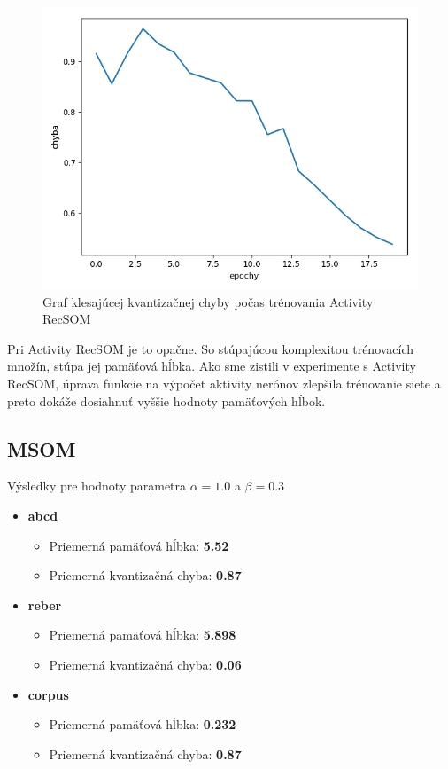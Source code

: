 \begin{figure}[H]
    \centering
    \includegraphics[width=\textwidth]{assets/ra_error_top}
    \caption{Graf klesajúcej kvantizačnej chyby počas trénovania Activity RecSOM}
\end{figure}

Pri Activity RecSOM je to opačne. So stúpajúcou komplexitou trénovacích množín, 
stúpa jej pamäťová hĺbka. Ako sme zistili v experimente s Activity RecSOM, úprava funkcie 
na výpočet aktivity nerónov zlepšila trénovanie siete a preto dokáže dosiahnuť vyššie hodnoty
pamäťových hĺbok.


\subsection{MSOM}
Výsledky pre hodnoty parametra $\alpha = 1.0$ a $\beta = 0.3$
\begin{itemize}
    \item \textbf{abcd}
    \begin{itemize}
        \item Priemerná pamäťová hĺbka: \textbf{5.52}
        \item Priemerná kvantizačná chyba: \textbf{0.87}
    \end{itemize}
    \item \textbf{reber}
    \begin{itemize}
        \item Priemerná pamäťová hĺbka: \textbf{5.898}
        \item Priemerná kvantizačná chyba: \textbf{0.06}
    \end{itemize}
    \item \textbf{corpus}
    \begin{itemize}
        \item Priemerná pamäťová hĺbka: \textbf{0.232}
        \item Priemerná kvantizačná chyba: \textbf{0.87}
    \end{itemize}
\end{itemize}

